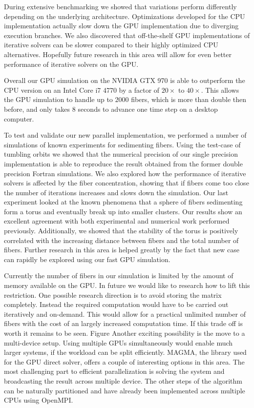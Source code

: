 \documentclass[a4paper,11pt]{kth-mag}
\begin{document}
During extensive benchmarking we showed that variations perform differently depending on the underlying architecture. Optimizations developed for the CPU implementation actually slow down the GPU implementation due to diverging execution branches. We also discovered that off-the-shelf GPU implementations of iterative solvers can be slower compared to their highly optimized CPU alternatives. Hopefully future research in this area will allow for even better performance of iterative solvers on the GPU.

Overall our GPU simulation on the NVIDIA GTX 970 is able to outperform the CPU version on an Intel Core i7 4770 by a factor of $20×$ to $40×$. This allows the GPU simulation to handle up to $2000$ fibers, which is more than double then before, and only takes $8$ seconds to advance one time step on a desktop computer.

To test and validate our new parallel implementation, we performed a number of simulations of known experiments for sedimenting fibers. Using the test-case of tumbling orbits we showed that the numerical precision of our single precision implementation is able to reproduce the result obtained from the former double precision Fortran simulations. We also explored how the performance of iterative solvers is affected by the fiber concentration, showing that if fibers come too close the number of iterations increases and slows down the simulation. Our last experiment looked at the known phenomena that a sphere of fibers sedimenting form a torus and eventually break up into smaller clusters. Our results show an excellent agreement with both experimental and numerical work performed previously. Additionally, we showed that the stability of the torus is positively correlated with the increasing distance between fibers and the total number of fibers. Further research in this area is helped greatly by the fact that new case can rapidly be explored using our fast GPU simulation.

Currently the number of fibers in our simulation is limited by the amount of memory available on the GPU. In future we would like to research how to lift this restriction. One possible research direction is to avoid storing the matrix completely. Instead the required computation would have to be carried out iteratively and on-demand. This would allow for a practical unlimited number of fibers with the cost of an largely increased computation time. If this trade off is worth it remains to be seen.
Figure
Another exciting possibility is the move to a multi-device setup. Using multiple GPUs simultaneously would enable much larger systems, if the workload can be split efficiently. MAGMA, the library used for the GPU direct solver, offers a couple of interesting options in this area. The most challenging part to efficient parallelization is solving the system and broadcasting the result across multiple device. The other steps of the algorithm can be naturally partitioned and have already been implemented across multiple CPUs using OpenMPI.
\end{document}
